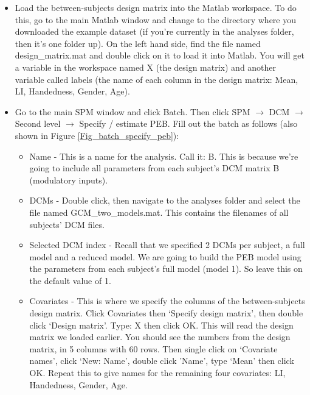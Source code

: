 \documentclass{article}
\begin{document}
\begin{itemize}
    \item Load the between-subjects design matrix into the Matlab workspace. To do this, go to the main Matlab window and change to the directory where you downloaded the example dataset (if you're currently in the analyses folder, then it's one folder up). On the left hand side, find the file named design\_matrix.mat and double click on it to load it into Matlab. You will get a variable in the workspace named X (the design matrix) and another variable called labels (the name of each column in the design matrix: Mean, LI, Handedness, Gender, Age). 
    \item Go to the main SPM window and click Batch. Then click SPM $\rightarrow$ DCM $\rightarrow$ Second level $\rightarrow$ Specify / estimate PEB. Fill out the batch as follows (also shown in Figure \ref{Fig_batch_specify_peb}):
    
    \begin{itemize}
        \item Name - This is a name for the analysis. Call it: B. This is because we're going to include all parameters from each subject's DCM matrix B (modulatory inputs).
        
        \item DCMs - Double click, then navigate to the analyses folder and select the file named  GCM\_two\_models.mat. This contains the filenames of all subjects' DCM files.
        
        \item Selected DCM index - Recall that we specified 2 DCMs per subject, a full model and a reduced model. We are going to build the PEB model using the parameters from each subject's full model (model 1). So leave this on the default value of 1.
        
        \item Covariates - This is where we specify the columns of the  between-subjects design matrix. Click Covariates then `Specify design matrix', then double click `Design matrix'. Type: X then click OK. This will read the design matrix we loaded earlier. You should see the numbers from the design matrix, in 5 columns with 60 rows. Then single click on `Covariate names', click `New: Name', double click 'Name', type `Mean' then click OK.  Repeat this to give names for the remaining four covariates: LI, Handedness, Gender, Age.
        

\end{itemize}
\end{itemize}
\end{document}
